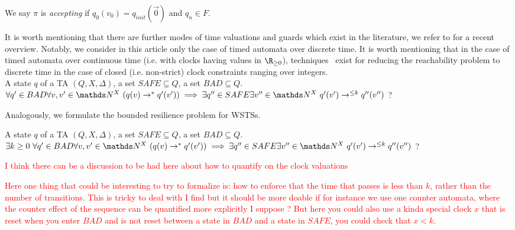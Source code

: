We say $\pi$ is {\em accepting} if $q_0(v_0) = q_{init}(\vec{0})$ and $q_n \in F$. 
\iffalse
We say {\em reachability holds} for the TA $\A$ 
if there exists an accepting run. %
\fi


It is worth mentioning that there are further modes of time valuations and guards which exist in the literature, we refer
to \cite{Andre19} for a recent overview. 
%
Notably, we consider in this article only the case of timed automata over discrete time. It is worth mentioning that in
the case of timed automata over continuous time (i.e. with clocks having values in $\R_{\geq 0}$),
techniques~\cite{HenzingerMP92,OuaknineW03} exist for reducing the reachability problem to discrete time in the case of closed (i.e. non-strict) clock constraints ranging over integers. \\




{A state $q$ of a TA $(Q, X, \Delta)$, a set $SAFE \subseteq Q$, a set $BAD \subseteq Q$.}
{$\forall q' \in BAD \forall v,v' \in \N^X ~ (q(v) \rightarrow^* q'(v')) \implies \exists q'' \in SAFE \exists v'' \in \N^X ~ q'(v') \rightarrow^{\leq k} q''(v'')$ ?\newline}


Analogously, we formulate the bounded resilience problem for WSTSs.


{A state $q$ of a TA $(Q, X, \Delta)$, a set $SAFE \subseteq Q$, a set $BAD \subseteq Q$.}
{$\exists k \geq 0 ~ \forall q' \in BAD \forall v,v' \in \N^X ~ (q(v) \rightarrow^* q'(v')) \implies \exists q'' \in SAFE \exists v'' \in \N^X ~ q'(v') \rightarrow^{\leq k} q''(v'')$ ?\newline}

\textcolor{red}{I think there can be a discussion to be had here about how to quantify on the clock valuations}

\textcolor{red}{Here one thing that could be interesting to try to formalize is: how to enforce that the time that passes is less than $k$, rather than the number of transitions. This is tricky to deal with I find but it should be more doable if for instance we use one counter automata, where the counter effect of the sequence can be quantified more explicitly I suppose ?
But here you could also use a kinda special clock $x$ that is reset when you enter $BAD$ and is not reset between a state in $BAD$ and a state in $SAFE$, you could check that $x < k$.}

